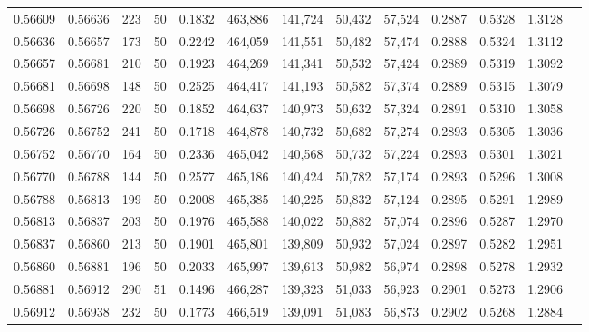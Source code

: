 \begin{tabular}{rrrrrrrrrrrrr}
0.56609 & 0.56636 &   223 &  50 &                                     0.1832 & 463,886 & 141,724 &  50,432 &  57,524 & 0.2887 & 0.5328 & 1.3128 \\
0.56636 & 0.56657 &   173 &  50 &                                     0.2242 & 464,059 & 141,551 &  50,482 &  57,474 & 0.2888 & 0.5324 & 1.3112 \\
0.56657 & 0.56681 &   210 &  50 &                                     0.1923 & 464,269 & 141,341 &  50,532 &  57,424 & 0.2889 & 0.5319 & 1.3092 \\
0.56681 & 0.56698 &   148 &  50 &                                     0.2525 & 464,417 & 141,193 &  50,582 &  57,374 & 0.2889 & 0.5315 & 1.3079 \\
0.56698 & 0.56726 &   220 &  50 &                                     0.1852 & 464,637 & 140,973 &  50,632 &  57,324 & 0.2891 & 0.5310 & 1.3058 \\
0.56726 & 0.56752 &   241 &  50 &                                     0.1718 & 464,878 & 140,732 &  50,682 &  57,274 & 0.2893 & 0.5305 & 1.3036 \\
0.56752 & 0.56770 &   164 &  50 &                                     0.2336 & 465,042 & 140,568 &  50,732 &  57,224 & 0.2893 & 0.5301 & 1.3021 \\
0.56770 & 0.56788 &   144 &  50 &                                     0.2577 & 465,186 & 140,424 &  50,782 &  57,174 & 0.2893 & 0.5296 & 1.3008 \\
0.56788 & 0.56813 &   199 &  50 &                                     0.2008 & 465,385 & 140,225 &  50,832 &  57,124 & 0.2895 & 0.5291 & 1.2989 \\
0.56813 & 0.56837 &   203 &  50 &                                     0.1976 & 465,588 & 140,022 &  50,882 &  57,074 & 0.2896 & 0.5287 & 1.2970 \\
0.56837 & 0.56860 &   213 &  50 &                                     0.1901 & 465,801 & 139,809 &  50,932 &  57,024 & 0.2897 & 0.5282 & 1.2951 \\
0.56860 & 0.56881 &   196 &  50 &                                     0.2033 & 465,997 & 139,613 &  50,982 &  56,974 & 0.2898 & 0.5278 & 1.2932 \\
0.56881 & 0.56912 &   290 &  51 &                                     0.1496 & 466,287 & 139,323 &  51,033 &  56,923 & 0.2901 & 0.5273 & 1.2906 \\
0.56912 & 0.56938 &   232 &  50 &                                     0.1773 & 466,519 & 139,091 &  51,083 &  56,873 & 0.2902 & 0.5268 & 1.2884 \\

\end{tabular}
